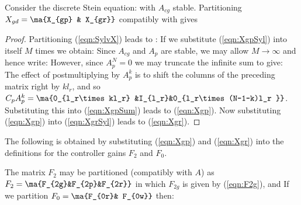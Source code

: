 \begin{lem}
\label{lem:SylvRecurs}
Consider the discrete Stein equation:
with $A_{cg}$ stable. Partitioning   $X_{gd}=\ma{X_{gp} & X_{gr}}$ compatibly with  
gives

\begin{proof}
Partitioning (\ref{eqn:SylvX}) leads to :
%
If we substitute (\ref{eqn:XgpSyl}) into itself $M$ times we obtain:
Since $A_{cg}$ and $A_p$ are stable, we may allow $M\rightarrow \infty$  and hence write:
However, since $A_p^N=0$ we may truncate the infinite sum to give:
The effect of postmultiplying by $A_p^k$ is to shift the columns of the preceding matrix right by $kl_r$, and so $C_pA_p^k=\ma{0_{l_r\times kl_r} &I_{l_r}&0_{l_r\times (N-1-k)l_r }}$. Substituting this into (\ref{eqn:XgpSum}) leads to (\ref{eqn:Xgp}). Now substituting (\ref{eqn:Xgp}) into (\ref{eqn:XgrSyl}) leads to (\ref{eqn:Xgr}).
\end{proof}
\end{lem}

The following is obtained by substituting (\ref{eqn:Xgp}) and (\ref{eqn:Xgr}) into the definitions for the controller gains $F_2$ and $F_0$.

\begin{cor}
The matrix $F_2$ may be partitioned (compatibly with $A$) as $F_2=\ma{F_{2g}&F_{2p}&F_{2r}}$ in which $F_{2g}$ is given by (\ref{eqn:F2g}), and 
If we partition $F_0=\ma{F_{0r}& F_{0w}}$ then:
\end{cor}


